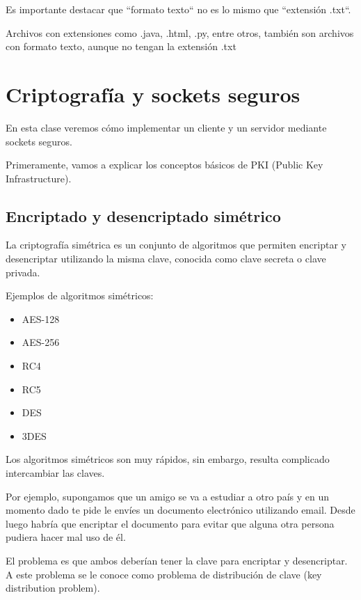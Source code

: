 \documentclass[11pt,a4paper,oneside]{book}
\begin{document}
Es importante destacar que ``formato texto`` no es lo mismo que ``extensión .txt``.

Archivos con extensiones como .java, .html, .py, entre otros, también son archivos con formato texto, aunque no tengan la extensión .txt

\chapter{Criptografía y sockets seguros}

En esta clase veremos cómo implementar un cliente y un servidor mediante sockets seguros.

Primeramente, vamos a explicar los conceptos básicos de PKI (Public Key Infrastructure).

\section{Encriptado y desencriptado simétrico}

La criptografía simétrica es un conjunto de algoritmos que permiten encriptar y desencriptar utilizando la misma clave, conocida como clave secreta o clave privada.

Ejemplos de algoritmos simétricos:

\begin{itemize}

\item AES-128

\item AES-256

\item RC4

\item RC5

\item DES

\item 3DES

\end{itemize}

Los algoritmos simétricos son muy rápidos, sin embargo, resulta complicado intercambiar las claves.

Por ejemplo, supongamos que un amigo se va a estudiar a otro país y en un momento dado te pide le envíes un documento electrónico utilizando email. Desde luego habría que encriptar el documento para evitar que alguna otra persona pudiera hacer mal uso de él.

El problema es que ambos deberían tener la clave para encriptar y desencriptar. A este problema se le conoce como problema de distribución de clave (key distribution problem).
\end{document}
